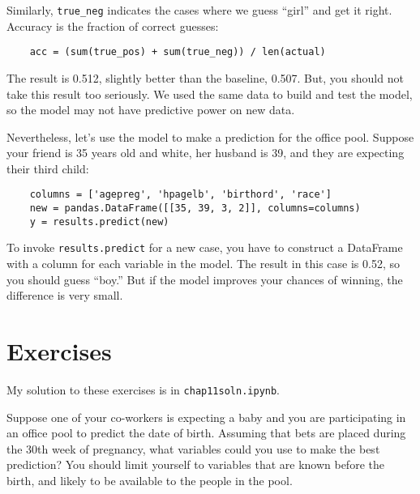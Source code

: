 Similarly, \verb"true_neg" indicates the cases where we guess ``girl''
and get it right.  Accuracy is the fraction of correct guesses:

\begin{verbatim}
    acc = (sum(true_pos) + sum(true_neg)) / len(actual)
\end{verbatim}

The result is 0.512, slightly better than the
baseline, 0.507.  But, you should not take this result too seriously.
We used the same data to build and test the model, so the model
may not have predictive power on new data.

Nevertheless, let's use the model to make a prediction for the office
pool.  Suppose your friend is 35 years old and white,
her husband is 39, and they are expecting their third child:

\begin{verbatim}
    columns = ['agepreg', 'hpagelb', 'birthord', 'race']
    new = pandas.DataFrame([[35, 39, 3, 2]], columns=columns)
    y = results.predict(new)
\end{verbatim}

To invoke {\tt results.predict} for a new case, you have to construct
a DataFrame with a column for each variable in the model.  The result
in this case is 0.52, so you should guess ``boy.''  But if the model
improves your chances of winning, the difference is very small.



\section{Exercises}

My solution to these exercises is in \verb"chap11soln.ipynb".

\begin{exercise}
Suppose one of your co-workers is expecting a baby and you are
participating in an office pool to predict the date of birth.
Assuming that bets are placed during the 30th week of pregnancy, what
variables could you use to make the best prediction?  You should limit
yourself to variables that are known before the birth, and likely to
be available to the people in the pool.

\end{exercise}


